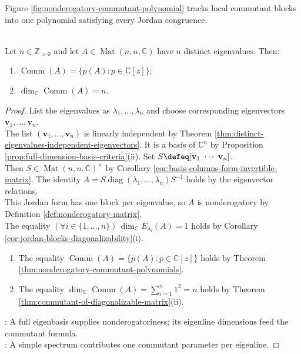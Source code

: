 Figure \ref{fig:nonderogatory-commutant-polynomial} tracks local commutant blocks into one polynomial satisfying every Jordan congruence.

\begin{illustrationfigure}[H]
  \centering
  
  \caption{Blockwise polynomial data merge into one polynomial modulo the Jordan-block powers.}
  \label{fig:nonderogatory-commutant-polynomial}
\end{illustrationfigure}

\begin{corollary} \label{cor:commutant-distinct-eigenvalues-polynomials} \\
Let $n\in\mathbb{Z}_{>0}$ and let $A\in\operatorname{Mat}(n,n,\mathbb{C})$ have $n$ distinct eigenvalues. Then:
\begin{enumerate}[label=(\roman*)]
\setlength{\itemsep}{0pt}
\item $\operatorname{Comm}(A)=\{p(A):p\in\mathbb{C}[z]\}$;
\item $\dim_{\mathbb{C}}\operatorname{Comm}(A)=n$.
\end{enumerate}
\begin{proof}
List the eigenvalues as $\lambda_1,\ldots,\lambda_n$ and choose corresponding eigenvectors $\mathbf{v}_1,\ldots,\mathbf{v}_n$.\\
The list $(\mathbf{v}_1,\ldots,\mathbf{v}_n)$ is linearly independent by Theorem \ref{thm:distinct-eigenvalues-independent-eigenvectors}. It is a basis of $\mathbb{C}^n$ by Proposition \ref{prop:full-dimension-basis-criteria}(ii). Set $S\defeq[\mathbf{v}_1\ \cdots\ \mathbf{v}_n]$.\\
Then $S\in\operatorname{Mat}(n,n,\mathbb{C})^{\times}$ by Corollary \ref{cor:basis-columns-form-invertible-matrix}. The identity $A=S\operatorname{diag}(\lambda_1,\ldots,\lambda_n)S^{-1}$ holds by the eigenvector relations.\\
This Jordan form has one block per eigenvalue, so $A$ is nonderogatory by Definition \ref{def:nonderogatory-matrix}.\\
The equality $(\forall i\in\{1,\ldots,n\})\,\dim_{\mathbb{C}}E_{\lambda_i}(A)=1$ holds by Corollary \ref{cor:jordan-blocks-diagonalizability}(i).
\begin{enumerate}[label=(\roman*)]
\setlength{\itemsep}{0pt}
\item The equality $\operatorname{Comm}(A)=\{p(A):p\in\mathbb{C}[z]\}$ holds by Theorem \ref{thm:nonderogatory-commutant-polynomials}.
\item The equality $\dim_{\mathbb{C}}\operatorname{Comm}(A)=\sum\limits_{i=1}^{n}1^2=n$ holds by Theorem \ref{thm:commutant-of-diagonalizable-matrix}(ii).
\end{enumerate}
: A full eigenbasis supplies nonderogatoriness; its eigenline dimensions feed the commutant formula.\\
: A simple spectrum contributes one commutant parameter per eigenline.
\end{proof}
\end{corollary}
